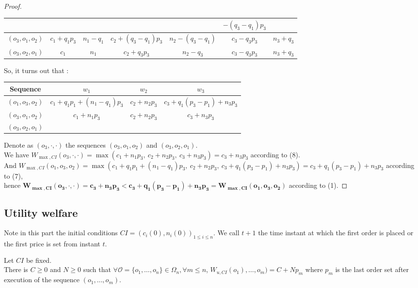 \documentclass[a4paper]{article}
\newcommand{\Oc}{\mathcal{O}}
\newtheorem[style=S, bodystyle=\noindent]{thm}{Theorem}[section]
\newtheorem[style=S, bodystyle=\noindent]{defn}[thm]{Definition}
\newtheorem[style=S, bodystyle=\noindent]{propo}[thm]{Proposition}
\newtheorem[style=S, bodystyle=\noindent]{prop}[thm]{Property}
\newtheorem[style=S, bodystyle=\noindent]{coro}[thm]{Corollary}
\newtheorem[style=S, bodystyle=\noindent]{lem}[thm]{Lemma}
\newtheorem[style=S, headstyle=\bfseries\boldmath Theorem, bodystyle=\noindent]{thm*}{Theorem}
\newtheorem[style=S, headstyle=\bfseries\boldmath Definition, bodystyle=\noindent]{defn*}{Definition}
\newtheorem[style=S, headstyle=\bfseries\boldmath Proposition, bodystyle=\noindent]{propo*}{Proposition}
\newtheorem[style=S, headstyle=\bfseries\boldmath Property, bodystyle=\noindent]{prop*}{Property}
\newtheorem[style=S, headstyle=\bfseries\boldmath Corollary, bodystyle=\noindent]{coro*}{Corollary}
\newtheorem[style=S, headstyle=\bfseries\boldmath Lemma, bodystyle=\noindent]{lem*}{Lemma}
\begin{document}
\begin{proof}
\begin{center}
\begin{tabular}{|c|c|c|c|c|c|c|}
		& & & & &  $-(q_3-q_1)p_3$ & \\
		\hline
		$(o_3,o_1,o_2)$ & $c_1+q_1p_3$ & $n_1-q_1$ & $c_2 + (q_3-q_1)p_3$ & $n_2 - (q_3-q_1)$ & $c_3 - q_3p_3$ & $n_3+q_3$ \\
		\hline
		$(o_3,o_2,o_1)$ & $c_1$ & $n_1$ & $c_2+q_3p_3$ & $n_2-q_3$ & $c_3-q_3p_3$ & $n_3+q_3$ \\
		\hline
	\end{tabular}
	\end{center}
	So, it turns out that :
	\begin{center}
	\begin{tabular}{|c|c|c|c|}
		\hline
		Sequence & $w_1$ & $w_2$ & $w_3$ \\
		\hline
		$(o_1, o_3, o_2)$ & $c_1 + q_1p_1 + (n_1-q_1)p_3$ & $c_2+n_2p_3$ & $c_3+q_1(p_3-p_1)+n_3p_3$ \\
		\hline
		$(o_3,o_1,o_2)$ & \multirow{2}{*}{$c_1+n_1p_3$} & \multirow{2}{*}{$c_2+n_2p_3$} & \multirow{2}{*}{$c_3+n_3p_3$} \\
		\cline{1-1}
		$(o_3,o_2,o_1)$ & & & \\
		\hline
	\end{tabular}
	\end{center}
	Denote as $(o_3, \cdot, \cdot)$ the sequences $(o_3,o_1,o_2)$ and $(o_3,o_2,o_1)$. \\
	We have $W_{\max,CI}(o_3, \cdot, \cdot) = \max(c_1+n_1p_3,~c_2+n_2p_3,~c_3+n_3p_3) = c_3+n_3p_3$ according to (8). \\
	And $W_{\max,CI}(o_1, o_3, o_2) = \max(c_1 + q_1p_1 + (n_1-q_1)p_3,~c_2+n_2p_3,~c_3+q_1(p_3-p_1)+n_3p_3) = c_3+q_1(p_3-p_1)+n_3p_3$ according to (7), \\
    hence $\boldsymbol{W_{\max,CI}(o_3, \cdot, \cdot) = c_3+n_3p_3 < c_3+q_1(p_3-p_1)+n_3p_3 = W_{\max,CI}(o_1, o_3, o_2)}$ according to (1).
\end{proof}

\subsection{Utility welfare}

Note in this part the initial conditions $CI = (c_i(0), n_i(0))_{1\leq i\leq n}$. We call $t+1$ the time instant at which the first order is placed or the first price is set from instant $t$.

\begin{lem}
	Let $CI$ be fixed. \\
	There is $C\geq $0 and $N\geq $0 such that $\forall \Oc = \{o_1, \ldots, o_n\}\in \Omega_n, \forall m \leq n$, $W_{u, CI}(o_1), \ldots, o_m) = C + Np_m$ where $p_m$ is the last order set after execution of the sequence $(o_1, \ldots, o_m)$.
\end{lem}
\end{document}
